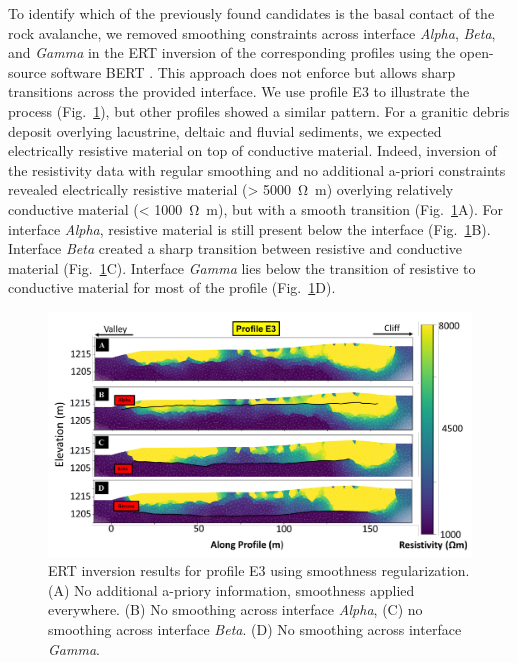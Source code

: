 \documentclass[utf8]{frontiersSCNS}
\begin{document}
To identify which of the previously found candidates is the basal contact of the rock avalanche, we removed smoothing constraints across interface \emph{Alpha}, \emph{Beta}, and \emph{Gamma} in the ERT inversion of the corresponding profiles \citep{doetsch2012constraining} using the open-source software BERT \cite[][]{gunther2006three,Ruecker2017}. This  approach does not enforce but allows sharp transitions across the provided interface. We use profile E3 to illustrate the process (Fig.~\ref{ERT_inversion}), but other profiles showed a similar pattern. For a granitic debris deposit overlying lacustrine, deltaic and fluvial sediments, we expected electrically resistive material on top of conductive material. Indeed, inversion of the resistivity data with regular smoothing and no additional a-priori constraints revealed electrically resistive material (\SI{> 5000}{\ohm m}) overlying relatively conductive material (\SI{< 1000}{\ohm m}), but with a smooth transition (Fig.~\ref{ERT_inversion}A). For interface \emph{Alpha}, resistive material is still present below the interface (Fig.~\ref{ERT_inversion}B). Interface \emph{Beta} created a sharp transition between resistive and conductive material (Fig.~\ref{ERT_inversion}C). Interface \emph{Gamma} lies below the transition of resistive to conductive material for most of the profile (Fig.~\ref{ERT_inversion}D). 




							 \begin{figure}

	\includegraphics[width=\textwidth]{Figures/ERT_inversion.pdf}
		\caption{ERT inversion results for profile E3 using smoothness regularization. (A) No additional a-priory information, smoothness applied everywhere. (B) No smoothing across interface \emph{Alpha}, (C) no smoothing across interface \emph{Beta}. (D) No smoothing across interface \emph{Gamma}.\label{ERT_inversion}}

								   \end{figure}
\end{document}
